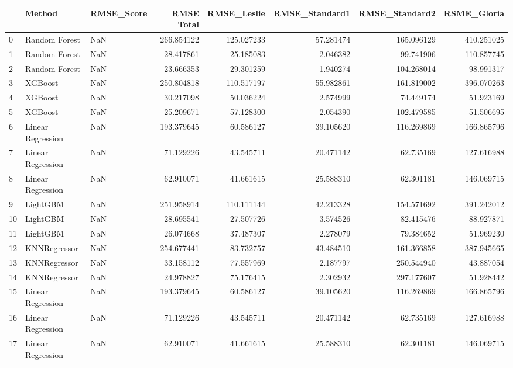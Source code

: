 \begin{tabular}{lllrrrrr}
\toprule
{} &             Method & RMSE\_Score &  RMSE Total &  RMSE\_Leslie &  RMSE\_Standard1 &  RMSE\_Standard2 &  RSME\_Gloria \\
\midrule
0  &      Random Forest &        NaN &  266.854122 &   125.027233 &       57.281474 &      165.096129 &   410.251025 \\
1  &      Random Forest &        NaN &   28.417861 &    25.185083 &        2.046382 &       99.741906 &   110.857745 \\
2  &      Random Forest &        NaN &   23.666353 &    29.301259 &        1.940274 &      104.268014 &    98.991317 \\
3  &            XGBoost &        NaN &  250.804818 &   110.517197 &       55.982861 &      161.819002 &   396.070263 \\
4  &            XGBoost &        NaN &   30.217098 &    50.036224 &        2.574999 &       74.449174 &    51.923169 \\
5  &            XGBoost &        NaN &   25.209671 &    57.128300 &        2.054390 &      102.479585 &    51.506695 \\
6  &  Linear Regression &        NaN &  193.379645 &    60.586127 &       39.105620 &      116.269869 &   166.865796 \\
7  &  Linear Regression &        NaN &   71.129226 &    43.545711 &       20.471142 &       62.735169 &   127.616988 \\
8  &  Linear Regression &        NaN &   62.910071 &    41.661615 &       25.588310 &       62.301181 &   146.069715 \\
9  &           LightGBM &        NaN &  251.958914 &   110.111144 &       42.213328 &      154.571692 &   391.242012 \\
10 &           LightGBM &        NaN &   28.695541 &    27.507726 &        3.574526 &       82.415476 &    88.927871 \\
11 &           LightGBM &        NaN &   26.074668 &    37.487307 &        2.278079 &       79.384652 &    51.969230 \\
12 &       KNNRegressor &        NaN &  254.677441 &    83.732757 &       43.484510 &      161.366858 &   387.945665 \\
13 &       KNNRegressor &        NaN &   33.158112 &    77.557969 &        2.187797 &      250.544940 &    43.887054 \\
14 &       KNNRegressor &        NaN &   24.978827 &    75.176415 &        2.302932 &      297.177607 &    51.928442 \\
15 &  Linear Regression &        NaN &  193.379645 &    60.586127 &       39.105620 &      116.269869 &   166.865796 \\
16 &  Linear Regression &        NaN &   71.129226 &    43.545711 &       20.471142 &       62.735169 &   127.616988 \\
17 &  Linear Regression &        NaN &   62.910071 &    41.661615 &       25.588310 &       62.301181 &   146.069715 \\
\bottomrule
\end{tabular}
